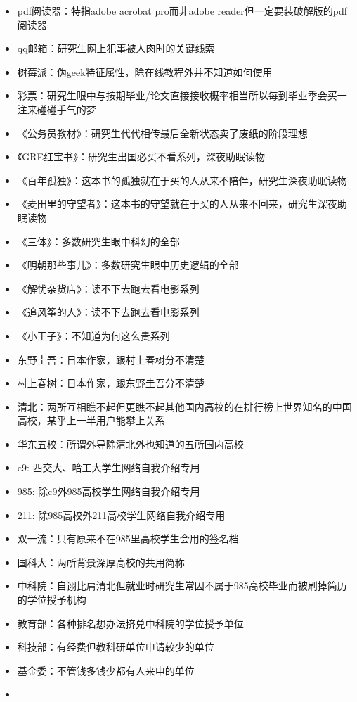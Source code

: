 \documentclass[]{tufte-book}
\begin{document}
\begin{itemize}
\item
  pdf阅读器：特指adobe acrobat pro而非adobe reader但一定要装破解版的pdf阅读器
\item
  qq邮箱：研究生网上犯事被人肉时的关键线索
\item
  树莓派：伪geek特征属性，除在线教程外并不知道如何使用
\item
  彩票：研究生眼中与按期毕业/论文直接接收概率相当所以每到毕业季会买一注来碰碰手气的梦
\item
  《公务员教材》：研究生代代相传最后全新状态卖了废纸的阶段理想
\item
  《GRE红宝书》：研究生出国必买不看系列，深夜助眠读物
\item
  《百年孤独》：这本书的孤独就在于买的人从来不陪伴，研究生深夜助眠读物
\item
  《麦田里的守望者》：这本书的守望就在于买的人从来不回来，研究生深夜助眠读物
\item
  《三体》：多数研究生眼中科幻的全部
\item
  《明朝那些事儿》：多数研究生眼中历史逻辑的全部
\item
  《解忧杂货店》：读不下去跑去看电影系列
\item
  《追风筝的人》：读不下去跑去看电影系列
\item
  《小王子》：不知道为何这么贵系列
\item
  东野圭吾：日本作家，跟村上春树分不清楚
\item
  村上春树：日本作家，跟东野圭吾分不清楚
\item
  清北：两所互相瞧不起但更瞧不起其他国内高校的在排行榜上世界知名的中国高校，某乎上一半用户能攀上关系
\item
  华东五校：所谓外导除清北外也知道的五所国内高校
\item
  c9: 西交大、哈工大学生网络自我介绍专用
\item
  985: 除c9外985高校学生网络自我介绍专用
\item
  211: 除985高校外211高校学生网络自我介绍专用
\item
  双一流：只有原来不在985里高校学生会用的签名档
\item
  国科大：两所背景深厚高校的共用简称
\item
  中科院：自诩比肩清北但就业时研究生常因不属于985高校毕业而被刷掉简历的学位授予机构
\item
  教育部：各种排名想办法挤兑中科院的学位授予单位
\item
  科技部：有经费但教科研单位申请较少的单位
\item
  基金委：不管钱多钱少都有人来申的单位
\item

\end{itemize}
\end{document}
